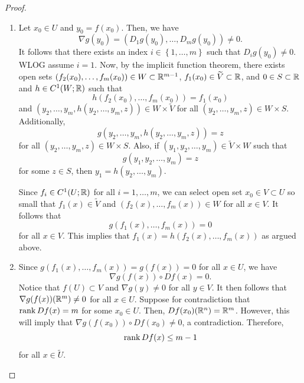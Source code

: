 \documentclass[a4paper]{article}
\begin{document}
\begin{proof}
  {
    \newcommand{\py}{{P_{Y_0}}}
    \newcommand{\pyy}{{P_{Y_1}}}
    \newcommand{\px}{{P_{X_0}}}
    \newcommand{\pxx}{{P_{X_1}}}
    \begin{enumerate}
      \item Let $x_0 \in U$ and $y_0 = f(x_0)$. Then, we have
            \[
              \nabla g(y_0) = (D_1 g (y_0), \dots, D_m g(y_0)) \neq 0.
            \]
            It follows that there exists an index $i \in \left\{ 1, \dots,
            m \right\}$ such that $D_i g(y_0) \neq 0$. WLOG assume $i =
            1$. Now, by the implicit function theorem, there exists open
            sets $(f_2(x_0), \dots, f_m(x_0)) \in W \subset \mathbb{R}^{m-1}$,
            $f_1(x_0) \in \widetilde{V} \subset \mathbb{R}$, and $0 \in S \subset \mathbb{R}$
            and $h \in C^1(W ; \mathbb{R})$ such that
            \[
              h(f_2(x_0), \dots, f_m(x_0)) = f_1(x_0)
            \]
            and $(y_2, \dots, y_m, h(y_2, \dots, y_m, z)) \in W \times
            \tilde{V}$ for all $(y_2, \dots, y_m, z) \in W \times S$.
            Additionally,
            \[
              g(y_2, \dots, y_m, h(y_2, \dots, y_m, z)) = z
            \]
            for all $(y_2, \dots, y_m, z) \in W \times S$. Also, if $(y_1,
            y_2, \dots, y_m) \in \tilde{V} \times W$ such that
            \[
              g(y_1, y_2, \dots, y_m) = z
            \]
            for some $z \in S$, then $y_1 = h(y_2, \dots, y_m)$.

            Since $f_i \in C^1(U; \mathbb{R})$ for all $i = 1, \dots, m$, we can
            select open set $x_0 \in V \subset U$ so small that $f_1(x)
            \in \tilde{V}$ and $(f_2(x), \dots, f_m(x)) \in W$ for all $x
            \in V$. It follows that
            \[
              g(f_1(x), \dots, f_m(x)) = 0
            \]
            for all $x \in V$. This implies that $f_1(x) = h(f_2(x),
            \dots, f_m(x))$ as argued above.

      \item Since $g(f_1(x), \dots, f_m(x)) = g(f(x)) = 0$ for all $x \in
            U$, we have
            \[
              \nabla g(f(x)) \circ Df(x) = 0.
            \]
            Notice that $f(U) \subset V$ and $\nabla g(y) \neq 0$ for all
            $y \in V$. It then follows that $\nabla g(f(x)) (\mathbb{R}^m) \neq 0$
            for all $x \in U$. Suppose for contradiction that $\operatorname{rank} Df(x)
            = m$ for some $x_0 \in U$. Then, $Df(x_0) (\mathbb{R}^n) = \mathbb{R}^m$.
            However, this will imply that $\nabla g(f(x_0)) \circ Df(x_0)
            \neq 0$, a contradiction. Therefore,
            \[
              \operatorname{rank} Df(x) \leq m - 1
            \]
            for all $x \in \tilde{U}$.


\end{enumerate}}
\end{proof}
\end{document}

